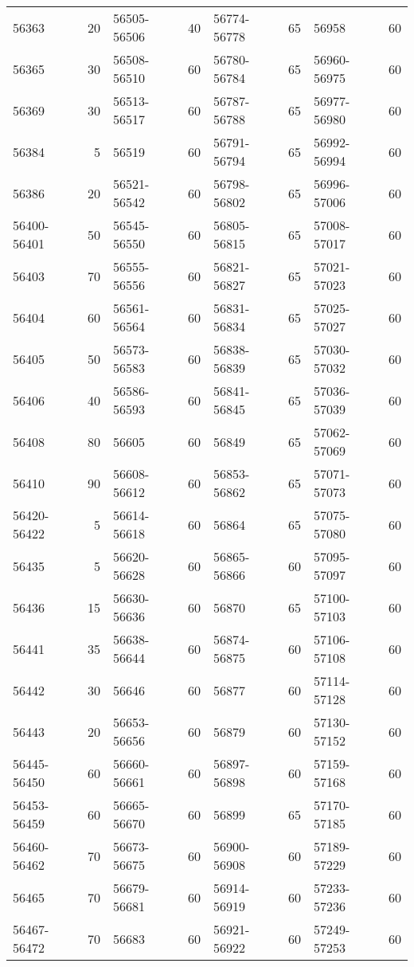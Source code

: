 \begin{center}
\begin{singlespacing}
\begin{longtable}{lr|lr|lr|lr}
56363	&	20	&	56505-56506 	&	40	&	 56774-56778 	&	65	&	56958	&	60	\\
56365	&	30	&	56508-56510 	&	60	&	 56780-56784 	&	65	&	 56960-56975 	&	60	\\
56369	&	30	&	56513-56517 	&	60	&	 56787-56788 	&	65	&	 56977-56980 	&	60	\\
56384	&	5	&	56519	&	60	&	 56791-56794 	&	65	&	 56992-56994 	&	60	\\
56386	&	20	&	56521-56542 	&	60	&	 56798-56802 	&	65	&	 56996-57006 	&	60	\\
56400-56401 	&	50	&	56545-56550 	&	60	&	 56805-56815 	&	65	&	 57008-57017 	&	60	\\
56403	&	70	&	56555-56556 	&	60	&	 56821-56827 	&	65	&	 57021-57023 	&	60	\\
56404	&	60	&	56561-56564 	&	60	&	 56831-56834 	&	65	&	 57025-57027 	&	60	\\
56405	&	50	&	56573-56583 	&	60	&	 56838-56839 	&	65	&	 57030-57032 	&	60	\\
56406	&	40	&	56586-56593 	&	60	&	 56841-56845 	&	65	&	 57036-57039 	&	60	\\
56408	&	80	&	56605	&	60	&	56849	&	65	&	 57062-57069 	&	60	\\
56410	&	90	&	 56608-56612 	&	60	&	 56853-56862 	&	65	&	 57071-57073 	&	60	\\
56420-56422 	&	5	&	 56614-56618 	&	60	&	56864	&	65	&	 57075-57080 	&	60	\\
56435	&	5	&	 56620-56628 	&	60	&	 56865-56866 	&	60	&	 57095-57097 	&	60	\\
56436	&	15	&	 56630-56636 	&	60	&	56870	&	65	&	 57100-57103 	&	60	\\
56441	&	35	&	 56638-56644 	&	60	&	 56874-56875 	&	60	&	 57106-57108 	&	60	\\
56442	&	30	&	56646	&	60	&	56877	&	60	&	 57114-57128 	&	60	\\
56443	&	20	&	 56653-56656 	&	60	&	56879	&	60	&	 57130-57152 	&	60	\\
56445-56450 	&	60	&	 56660-56661 	&	60	&	 56897-56898 	&	60	&	 57159-57168 	&	60	\\
56453-56459 	&	60	&	 56665-56670 	&	60	&	56899	&	65	&	 57170-57185 	&	60	\\
56460-56462 	&	70	&	 56673-56675 	&	60	&	 56900-56908 	&	60	&	 57189-57229 	&	60	\\
56465	&	70	&	 56679-56681 	&	60	&	 56914-56919 	&	60	&	 57233-57236 	&	60	\\
56467-56472 	&	70	&	56683	&	60	&	 56921-56922 	&	60	&	 57249-57253 	&	60	\\

\end{longtable}
\end{singlespacing}
\end{center}
